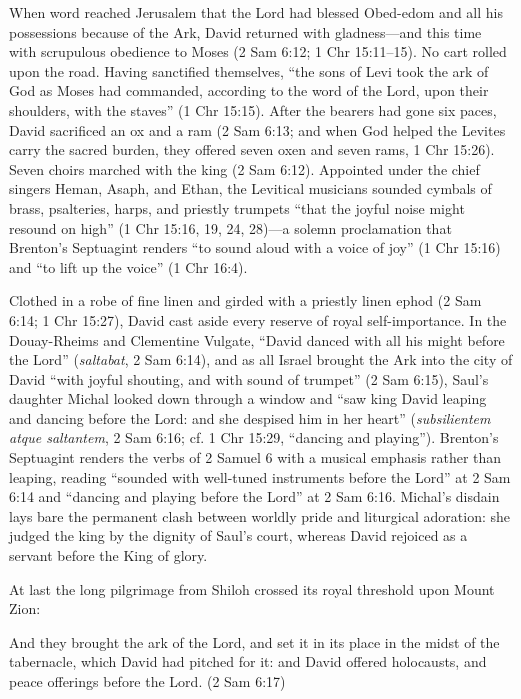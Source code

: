 When word reached Jerusalem that the Lord had blessed Obed-edom and all his possessions because of the Ark, David returned with gladness---and this time with scrupulous obedience to Moses (2 Sam 6:12; 1 Chr 15:11--15). No cart rolled upon the road. Having sanctified themselves, ``the sons of Levi took the ark of God as Moses had commanded, according to the word of the Lord, upon their shoulders, with the staves'' (1 Chr 15:15). After the bearers had gone six paces, David sacrificed an ox and a ram (2 Sam 6:13; and when God helped the Levites carry the sacred burden, they offered seven oxen and seven rams, 1 Chr 15:26). Seven choirs marched with the king (2 Sam 6:12). Appointed under the chief singers Heman, Asaph, and Ethan, the Levitical musicians sounded cymbals of brass, psalteries, harps, and priestly trumpets ``that the joyful noise might resound on high'' (1 Chr 15:16, 19, 24, 28)---a solemn proclamation that Brenton's Septuagint renders ``to sound aloud with a voice of joy'' (1 Chr 15:16) and ``to lift up the voice'' (1 Chr 16:4).

Clothed in a robe of fine linen and girded with a priestly linen ephod (2 Sam 6:14; 1 Chr 15:27), David cast aside every reserve of royal self-importance. In the Douay-Rheims and Clementine Vulgate, ``David danced with all his might before the Lord'' (\textit{saltabat}, 2 Sam 6:14), and as all Israel brought the Ark into the city of David ``with joyful shouting, and with sound of trumpet'' (2 Sam 6:15), Saul's daughter Michal looked down through a window and ``saw king David leaping and dancing before the Lord: and she despised him in her heart'' (\textit{subsilientem atque saltantem}, 2 Sam 6:16; cf. 1 Chr 15:29, ``dancing and playing''). Brenton's Septuagint renders the verbs of 2 Samuel 6 with a musical emphasis rather than leaping, reading ``sounded with well-tuned instruments before the Lord'' at 2 Sam 6:14 and ``dancing and playing before the Lord'' at 2 Sam 6:16. Michal's disdain lays bare the permanent clash between worldly pride and liturgical adoration: she judged the king by the dignity of Saul's court, whereas David rejoiced as a servant before the King of glory.

At last the long pilgrimage from Shiloh crossed its royal threshold upon Mount Zion:

\begin{scriptureblock}
And they brought the ark of the Lord, and set it in its place in the midst of the tabernacle, which David had pitched for it: and David offered holocausts, and peace offerings before the Lord. \textnormal{(2 Sam 6:17)}
\end{scriptureblock}

